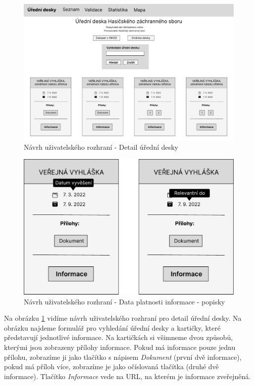 \begin{figure} 
\includegraphics[width=\textwidth, frame]{cs/obrazky/wireframes/wireframe_detail.pdf}
\caption{Návrh uživatelského rozhraní - Detail úřední desky}
\label{fig:detail}
\end{figure}

\begin{figure} 
\includegraphics[width=1\textwidth]{cs/obrazky/wireframes/wireframe_detail_datum.pdf}
\caption{Návrh uživatelského rozhraní - Data platnosti informace - popisky}
\label{fig:detail-datum}
\end{figure}

Na obrázku \ref{fig:detail} vidíme návrh uživatelského rozhraní pro detail úřední desky. Na obrázku najdeme formulář pro vyhledání úřední desky a kartičky, které představují jednotlivé informace. Na kartičkách si všimneme dvou způsobů, kterými jsou zobrazeny přílohy informace. Pokud má informace pouze jednu přílohu, zobrazíme ji jako tlačítko s nápisem \textit{Dokument} (první dvě informace), pokud má příloh více, zobrazíme je jako očíslovaná tlačítka (druhé dvě informace). Tlačítko \textit{Informace} vede na URL, na kterém je informace zveřejněná.

